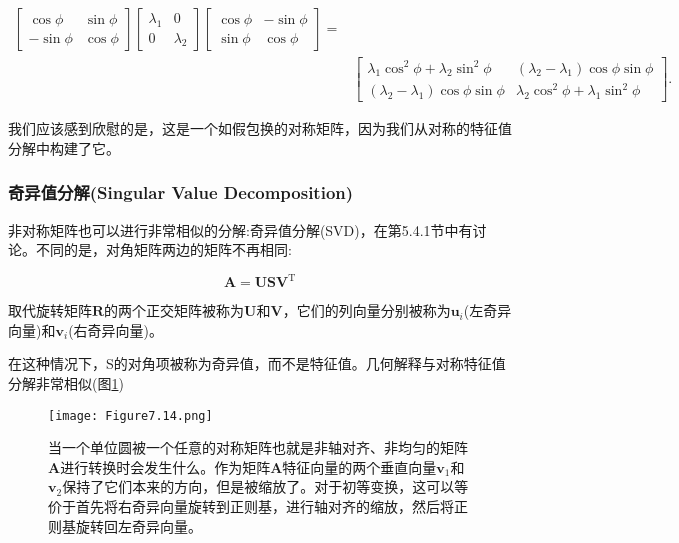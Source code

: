 \begin{example}
\begin{equation}
	\begin{aligned}
		{\left[\begin{array}{rr}
				\cos \phi & \sin \phi \\
				-\sin \phi & \cos \phi
			\end{array}\right]\left[\begin{array}{cc}
				\lambda_1 & 0 \\
				0 & \lambda_2
			\end{array}\right]\left[\begin{array}{rr}
				\cos \phi & -\sin \phi \\
				\sin \phi & \cos \phi
			\end{array}\right]=} & \\
		& {\left[\begin{array}{ll}
				\lambda_1 \cos ^2 \phi+\lambda_2 \sin ^2 \phi & \left(\lambda_2-\lambda_1\right) \cos \phi \sin \phi \\
				\left(\lambda_2-\lambda_1\right) \cos \phi \sin \phi & \lambda_2 \cos ^2 \phi+\lambda_1 \sin ^2 \phi
			\end{array}\right] . }
	\end{aligned}
\nonumber
\end{equation}

我们应该感到欣慰的是，这是一个如假包换的对称矩阵，因为我们从对称的特征值分解中构建了它。

\end{example}


\subsubsection*{\textcolor{structure3}{奇异值分解(Singular Value Decomposition)}}

非对称矩阵也可以进行非常相似的分解:奇异值分解(SVD)，在第5.4.1节中有讨论。不同的是，对角矩阵两边的矩阵不再相同:

\begin{equation}
	\mathbf{A}=\mathbf{U S V}^{\mathrm{T}}
	\nonumber
\end{equation}

取代旋转矩阵$\mathbf{R}$的两个正交矩阵被称为$\mathbf{U}$和$\mathbf{V}$，它们的列向量分别被称为$\mathbf{u}_{i}$(左奇异向量)和$\mathbf{v}_{i}$(右奇异向量)。

在这种情况下，S的对角项被称为奇异值，而不是特征值。几何解释与对称特征值分解非常相似(图\ref{fig:7.14})

\begin{figure}[htbp]
	\centering
	\texttt{[image: Figure7.14.png]}
	\caption{当一个单位圆被一个任意的对称矩阵也就是非轴对齐、非均匀的矩阵$\mathbf{A}$进行转换时会发生什么。作为矩阵$\mathbf{A}$特征向量的两个垂直向量$\mathbf{v}_{1}$和$\mathbf{v}_{2}$保持了它们本来的方向，但是被缩放了。对于初等变换，这可以等价于首先将右奇异向量旋转到正则基，进行轴对齐的缩放，然后将正则基旋转回左奇异向量。}
	\label{fig:7.14}
\end{figure}	


